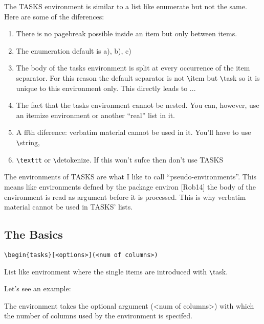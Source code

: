 \documentclass[a4paper,12pt,indent]{article}
\begin{document}
The \textcolor{Tasks}{TASKS} environment is similar to a list like enumerate but not the same. Here are some of
the diferences:
\begin{enumerate}
    \item  There is no pagebreak possible inside an item but only between items.

    \item  The enumeration default is a), b), c)

    \item The body of the tasks environment is split at every occurrence of the item separator. For
this reason the default separator is not \verb|\|\textcolor{Tasks}{item} but \verb|\|\textcolor{Tasks}{task} so it is unique to this environment
only. This directly leads to ...

\item The fact that the tasks environment cannot be nested. You can, however, use an
itemize environment or another ``real'' list in it.

\item A ffth diference: verbatim material cannot be used in it. You’ll have to use \verb|\|\textcolor{Tasks}{string},
\item
\verb|\texttt| or \verb|\|\textcolor{Tasks}{detokenize}. If this won’t sufce then don’t use \textcolor{Tasks}{TASKS}

\end{enumerate}

\begin{tcolorbox}[arc=3mm,boxrule=1pt,colframe=red!75!black,
    colback=white]
   The environments of \textcolor{Tasks}{TASKS} are what I like to call “pseudo-environments”. This means
like environments defned by the package environ [Rob14] the body of the environment
is read as argument before it is processed. This is why verbatim material cannot be used
in \textcolor{Tasks}{TASKS}' lists.
   \end{tcolorbox}

\subsection{The Basics}
\verb|\begin{tasks}[<options>](<num of columns>)|

List like environment where the single items are introduced with \verb|\|\textcolor{Tasks}{task}.

Let’s see an example:

The environment takes the optional argument (<num of columns>) with which the number
of columns used by the environment is specifed.
\end{document}
